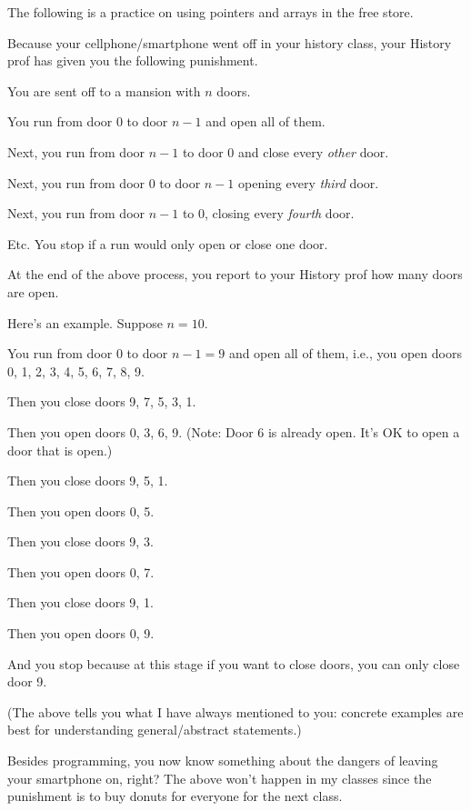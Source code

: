 The following is a practice on using pointers and
arrays in the free store.

Because your cellphone/smartphone went off in your history class,
your History prof has given you the following punishment.

You are sent off to a 
mansion with $n$ doors.
\begin{enumerate}[nosep]

  \li You run from door 0 to door $n-1$ and open all of them.

  \li Next, you run from door $n - 1$ to door 0 and close every \textit{other}
  door.

  \li Next, you run from door $0$ to door $n-1$ opening every \textit{third}
  door.

  \li Next, you run from door $n-1$ to $0$, closing every \textit{fourth} door.

  \li Etc. You stop if a run would only open or close one door.

\end{enumerate}
At the end of the above process, you report to your History prof how many
doors are open.

Here's an example. Suppose $n = 10$.
\begin{enumerate}[nosep]
  \li You run from door 0 to door $n - 1 = 9$ and open all of them, i.e.,
  you open doors 0, 1, 2, 3, 4, 5, 6, 7, 8, 9.
  
  \li Then you close doors 9, 7, 5, 3, 1.
  
  \li Then you open doors 0, 3, 6, 9.
  (Note: Door 6 is already open. It's OK to open a door that is open.) 
  
  \li Then you close doors 9, 5, 1.
  
  \li Then you open doors 0, 5.
  
  \li Then you close doors 9, 3.
  
  \li Then you open doors 0, 7.
  
  \li Then you close doors 9, 1.
  
  \li Then you open doors 0, 9.
  
  \li And you stop because at this stage if you want to close doors, you can
  only close door 9.

\end{enumerate}
(The above tells you what I have always mentioned to you:
concrete examples are best for understanding general/abstract statements.)  

Besides programming, you now know something about the dangers of
leaving your smartphone on, right?
The above won't happen in my classes since the punishment is to buy
donuts for everyone for the next class.

